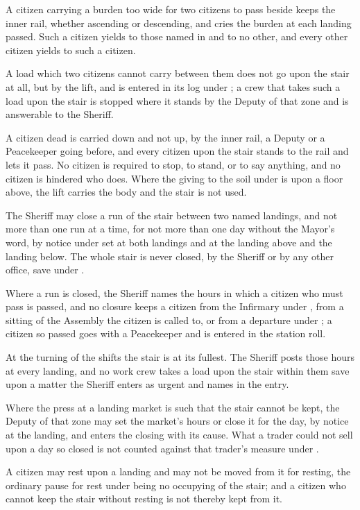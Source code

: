 \begin{clauses}
\item A citizen carrying a burden too wide for two citizens to pass beside keeps the inner rail, whether ascending or descending, and cries the burden at each landing passed. Such a citizen yields to those named in  and to no other, and every other citizen yields to such a citizen.
\item A load which two citizens cannot carry between them does not go upon the stair at all, but by the lift, and is entered in its log under ; a crew that takes such a load upon the stair is stopped where it stands by the Deputy of that zone and is answerable to the Sheriff.
\item A citizen dead is carried down and not up, by the inner rail, a Deputy or a Peacekeeper going before, and every citizen upon the stair stands to the rail and lets it pass. No citizen is required to stop, to stand, or to say anything, and no citizen is hindered who does. Where the giving to the soil under  is upon a floor above, the lift carries the body and the stair is not used.
\item The Sheriff may close a run of the stair between two named landings, and not more than one run at a time, for not more than one day without the Mayor's word, by notice under  set at both landings and at the landing above and the landing below. The whole stair is never closed, by the Sheriff or by any other office, save under .
\item Where a run is closed, the Sheriff names the hours in which a citizen who must pass is passed, and no closure keeps a citizen from the Infirmary under , from a sitting of the Assembly the citizen is called to, or from a departure under ; a citizen so passed goes with a Peacekeeper and is entered in the station roll.
\item At the turning of the shifts the stair is at its fullest. The Sheriff posts those hours at every landing, and no work crew takes a load upon the stair within them save upon a matter the Sheriff enters as urgent and names in the entry.
\item Where the press at a landing market is such that the stair cannot be kept, the Deputy of that zone may set the market's hours or close it for the day, by notice at the landing, and enters the closing with its cause. What a trader could not sell upon a day so closed is not counted against that trader's measure under .
\item A citizen may rest upon a landing and may not be moved from it for resting, the ordinary pause for rest under  being no occupying of the stair; and a citizen who cannot keep the stair without resting is not thereby kept from it.
\end{clauses}
